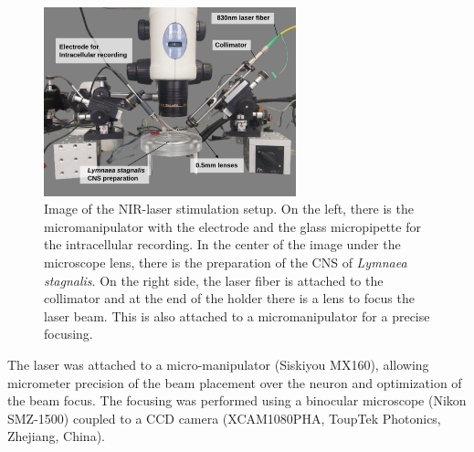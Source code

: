 \begin{figure}[htb!]
	\centering
	\includegraphics[width=0.65\textwidth]{img/methods/laser-setup_labels.png}
	\caption{Image of the NIR-laser stimulation setup. On the left, there is the micromanipulator with the electrode and the glass micropipette for the intracellular recording. In the center of the image under the microscope lens, there is the preparation of the CNS of \textit{Lymnaea stagnalis}. On the right side, the laser fiber is attached to the collimator and at the end of the holder there is a lens to focus the laser beam. This is also attached to a micromanipulator for a precise focusing.}
	\label{fig:laser setup}
\end{figure}

The laser was attached to a micro-manipulator (Siskiyou MX160), allowing micrometer precision of the beam placement over the neuron and optimization of the beam focus. The focusing was performed using a binocular microscope (Nikon SMZ-1500) coupled to a CCD camera (XCAM1080PHA, ToupTek Photonics, Zhejiang, China).
